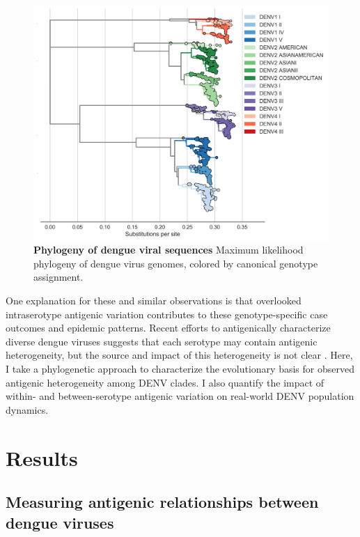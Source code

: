 \begin{figure}[h!]
  \begin{centering}
    \includegraphics[width=\linewidth]{./png/genotype_tree.png}
  	\caption[Phylogeny of dengue viral sequences]{\textbf{Phylogeny of dengue viral sequences }
    Maximum likelihood phylogeny of dengue virus genomes, colored by canonical genotype assignment.
    }
  	\label{genotype_tree}
  \end{centering}
\end{figure}

One explanation for these and similar observations is that overlooked intraserotype antigenic variation contributes to these genotype-specific case outcomes and epidemic patterns.
Recent efforts to antigenically characterize diverse dengue viruses suggests that each serotype may contain antigenic heterogeneity, but the source and impact of this heterogeneity is not clear \citep{katzelnick2015dengue}.
Here, I take a phylogenetic approach to characterize the evolutionary basis for observed antigenic heterogeneity among DENV clades.
I also quantify the impact of within- and between-serotype antigenic variation on real-world DENV population dynamics.

\section{Results}
\subsection{Measuring antigenic relationships between dengue viruses}

